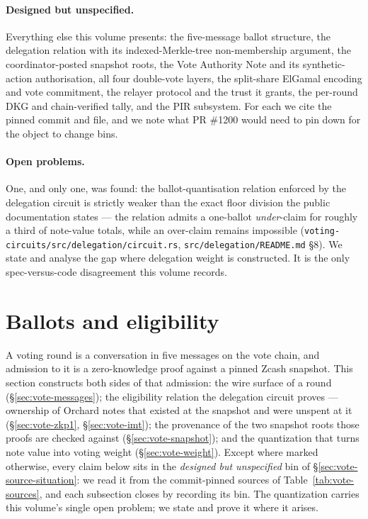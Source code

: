 \documentclass[11pt,a4paper]{article}
\theoremstyle{definition}
\begin{document}
\paragraph{Designed but unspecified.} Everything else this volume presents:
the five-message ballot structure, the delegation relation with its
indexed-Merkle-tree non-membership argument, the coordinator-posted snapshot
roots, the Vote Authority Note and its synthetic-action authorisation, all
four double-vote layers, the split-share ElGamal encoding and vote
commitment, the relayer protocol and the trust it grants, the per-round DKG
and chain-verified tally, and the PIR subsystem. For each we cite the pinned
commit and file, and we note what PR \#1200 would need to pin down for the
object to change bins.

\paragraph{Open problems.} One, and only one, was found: the
ballot-quantisation relation enforced by the delegation circuit is strictly
weaker than the exact floor division the public documentation states --- the
relation admits a one-ballot \emph{under}-claim for roughly a third of
note-value totals, while an over-claim remains impossible
(\texttt{voting-circuits/src/delegation/circuit.rs},
\texttt{src/delegation/README.md} \S8). We state and analyse the gap where
delegation weight is constructed. It is the only spec-versus-code
disagreement this volume records.

\section{Ballots and eligibility}\label{sec:vote-ballot}

A voting round is a conversation in five messages on the vote chain, and
admission to it is a zero-knowledge proof against a pinned Zcash snapshot.
This section constructs both sides of that admission: the wire surface of a
round (\S\ref{sec:vote-messages}); the eligibility relation the delegation
circuit proves --- ownership of Orchard notes that existed at the snapshot
and were unspent at it (\S\ref{sec:vote-zkp1}, \S\ref{sec:vote-imt}); the
provenance of the two snapshot roots those proofs are checked against
(\S\ref{sec:vote-snapshot}); and the quantization that turns note value into
voting weight (\S\ref{sec:vote-weight}). Except where marked otherwise,
every claim below sits in the \emph{designed but unspecified} bin of
\S\ref{sec:vote-source-situation}: we read it from the commit-pinned sources
of Table~\ref{tab:vote-sources}, and each subsection closes by recording its
bin. The quantization carries this volume's single open problem; we state
and prove it where it arises.
\end{document}
